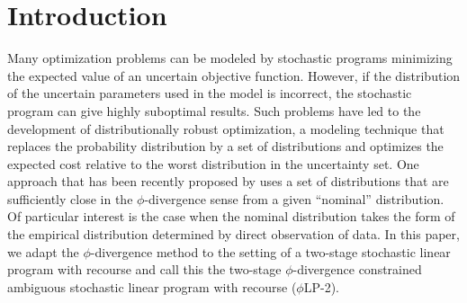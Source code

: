 \documentclass[opre,nonblindrev]{informs3} %
\newcommand{\plp}{$\phi$LP-2}
\begin{document}
%

\section{Introduction}

Many optimization problems can be modeled by stochastic programs minimizing the expected value of an uncertain objective function.
However, if the distribution of the uncertain parameters used in the model is incorrect, the stochastic program can give highly suboptimal results.
Such problems have led to the development of distributionally robust optimization, a modeling technique that replaces the probability distribution by a set of distributions and optimizes the expected cost relative to the worst distribution in the uncertainty set.
One approach that has been recently proposed by \citet{bental2011robust} uses a set of distributions that are sufficiently close in the $\phi$-divergence sense from a given ``nominal'' distribution. 
Of particular interest is the case when the nominal distribution takes the form of the empirical distribution determined by direct observation of data.
In this paper, we adapt the $\phi$-divergence method to the setting of a two-stage stochastic linear program with recourse and call this the two-stage $\phi$-divergence constrained ambiguous stochastic linear program with recourse (\plp).
\end{document}
